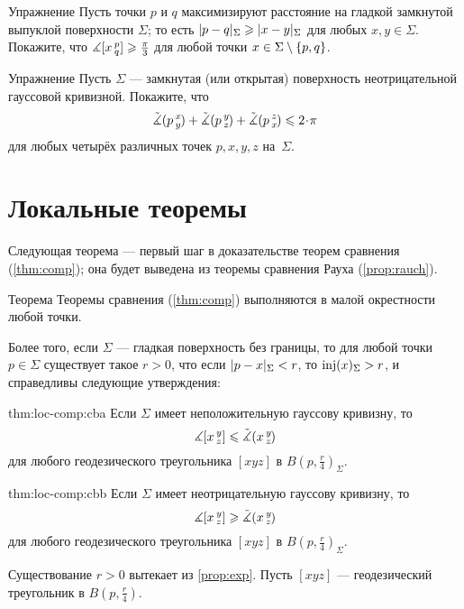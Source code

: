 \begin{thm}{Упражнение}\label{ex:diam-angle}
Пусть точки $p$ и $q$ максимизируют расстояние на гладкой замкнутой выпуклой поверхности $\Sigma$;
то есть $\dist{p}{q}\Sigma\z\ge\dist{x}{y}\Sigma$ для любых $x,y\in \Sigma$.
Покажите, что $\measuredangle[x\,{}^{p}_{q}]\geqslant \tfrac\pi3$
для любой точки $x\z\in \Sigma\setminus\{p,q\}$.
\end{thm}

\begin{thm}{Упражнение}\label{ex:sum=<2pi}
Пусть $\Sigma$ --- замкнутая (или открытая) поверхность неотрицательной гауссовой кривизной.
Покажите, что 
\[\modangle pxy+\modangle pyz+\modangle pzx\le2\cdot \pi\]
для любых четырёх различных точек $p,x,y,z$ на~$\Sigma$.
\end{thm}


\section{Локальные теоремы}\label{sec:loc-comp}

Следующая теорема --- первый шаг в доказательстве теорем сравнения (\ref{thm:comp});
она будет выведена из теоремы сравнения Рауха (\ref{prop:rauch}).

\begin{thm}{Теорема}\label{thm:loc-comp}
Теоремы сравнения (\ref{thm:comp}) выполняются в малой окрестности любой точки.

Более того, если $\Sigma$ --- гладкая поверхность без границы,
то для любой точки $p\in \Sigma$ существует такое $r>0$, что если $\dist{p}{x}\Sigma<r$, то $\mathop{\rm inj}\nolimits(x)_\Sigma>r$, и справедливы следующие утверждения:

\begin{subthm}{thm:loc-comp:cba}
Если $\Sigma$ имеет неположительную гауссову кривизну, то
\[\measuredangle[x\,{}^{y}_{z}]\leqslant\tilde\measuredangle(x\,{}^{y}_{z}\hspace{-0.2ex})\]
для любого геодезического треугольника $[xyz]$ в $B(p,\tfrac r4)_\Sigma$.
\end{subthm}

\begin{subthm}{thm:loc-comp:cbb}
Если $\Sigma$ имеет неотрицательную гауссову кривизну, то 
\[\measuredangle[x\,{}^{y}_{z}]\geqslant\tilde\measuredangle(x\,{}^{y}_{z}\hspace{-0.2ex})\]
для любого геодезического треугольника $[xyz]$ в $B(p,\tfrac r4)_\Sigma$.
\end{subthm}

\end{thm}

Существование $r>0$ вытекает из \ref{prop:exp}.
Пусть $[xyz]$ --- геодезический треугольник в $B(p,\tfrac{r}4)$.

